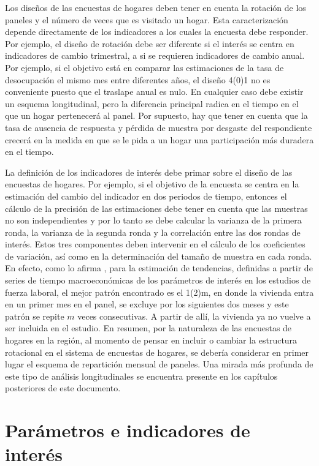 \documentclass[
  10pt,
  spanish,
]{book}
\begin{document}
Los diseños de las encuestas de hogares deben tener en cuenta la rotación de los paneles y el número de veces que es visitado un hogar. Esta caracterización depende directamente de los indicadores a los cuales la encuesta debe responder. Por ejemplo, el diseño de rotación debe ser diferente si el interés se centra en indicadores de cambio trimestral, a si se requieren indicadores de cambio anual. Por ejemplo, si el objetivo está en comparar las estimaciones de la tasa de desocupación el mismo mes entre diferentes años, el diseño 4(0)1 no es conveniente puesto que el traslape anual es nulo. En cualquier caso debe existir un esquema longitudinal, pero la diferencia principal radica en el tiempo en el que un hogar pertenecerá al panel. Por supuesto, hay que tener en cuenta que la tasa de ausencia de respuesta y pérdida de muestra por desgaste del respondiente crecerá en la medida en que se le pida a un hogar una participación más duradera en el tiempo.

La definición de los indicadores de interés debe primar sobre el diseño de las encuestas de hogares. Por ejemplo, si el objetivo de la encuesta se centra en la estimación del cambio del indicador en dos periodos de tiempo, entonces el cálculo de la precisión de las estimaciones debe tener en cuenta que las muestras no son independientes y por lo tanto se debe calcular la varianza de la primera ronda, la varianza de la segunda ronda y la correlación entre las dos rondas de interés. Estos tres componentes deben intervenir en el cálculo de los coeficientes de variación, así como en la determinación del tamaño de muestra en cada ronda. En efecto, como lo afirma \citet[pág. 236]{McLaren_Steel_2001}, para la estimación de tendencias, definidas a partir de series de tiempo macroeconómicas de los parámetros de interés en los estudios de fuerza laboral, el mejor patrón encontrado es el 1(2)m, en donde la vivienda entra en un primer mes en el panel, se excluye por los siguientes dos meses y este patrón se repite \(m\) veces consecutivas. A partir de allí, la vivienda ya no vuelve a ser incluida en el estudio. En resumen, por la naturaleza de las encuestas de hogares en la región, al momento de pensar en incluir o cambiar la estructura rotacional en el sistema de encuestas de hogares, se debería considerar en primer lugar el esquema de repartición mensual de paneles. Una mirada más profunda de este tipo de análisis longitudinales se encuentra presente en los capítulos posteriores de este documento.

\hypertarget{paruxe1metros-e-indicadores-de-interuxe9s}{%
\section{Parámetros e indicadores de interés}\label{paruxe1metros-e-indicadores-de-interuxe9s}}
\end{document}
